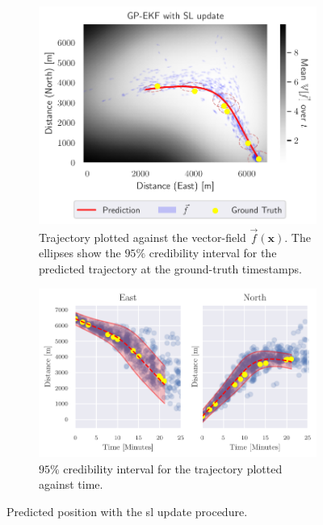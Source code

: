\begin{figure}
    \centering
    \begin{subfigure}{\textwidth}
        \centering
        \includegraphics[width=\textwidth]{figures/dyngp/gp_ekf_with_syn.pdf}
        \caption{Trajectory plotted against the vector-field $\vec{f}(\boldsymbol{x})$. The ellipses show the $95\%$ credibility interval for the predicted trajectory at the ground-truth timestamps.}
    \end{subfigure}
    \begin{subfigure}{\textwidth}
        \centering
        \includegraphics[width=\textwidth]{figures/dyngp/gp_ekf_with_syn_state.pdf}
        \caption{$95\%$ credibility interval for the trajectory plotted against time.}
    \end{subfigure}
    \caption{Predicted position with the \acrshort{sl} update procedure.}
    \label{fig:gp_ekf_with_syn}
\end{figure}


